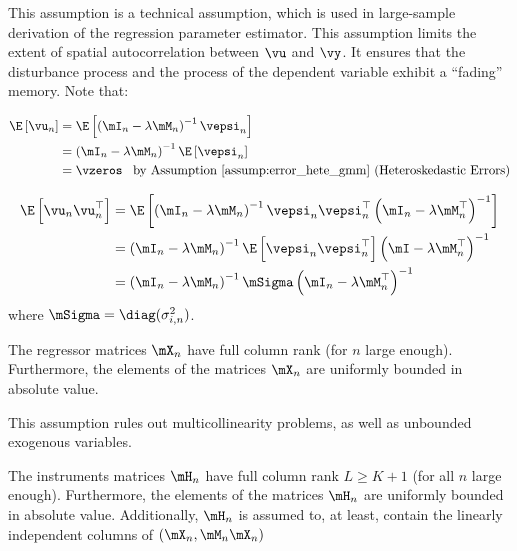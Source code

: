\documentclass[english,12pt]{book}\usepackage[]{graphicx}\usepackage[]{xcolor}
\begin{document}
This assumption is a technical assumption, which is used in large-sample derivation of the regression parameter estimator. This assumption limits the extent of spatial autocorrelation between $\vu$ and $\vy$. It ensures that the disturbance process and the process of the dependent variable exhibit a ``fading'' memory. Note that:

\begin{equation}
\begin{aligned}
\E\left[\vu_n \right] & = \E\left[\left(\mI_n - \lambda \mM_n\right)^{-1}\vepsi_n\right]  \\
             & = \left(\mI_n - \lambda \mM_n\right)^{-1} \E\left[\vepsi_n\right] \\
             & = \vzeros \;\;\;\mbox{by Assumption \ref{assump:error_hete_gmm} (Heteroskedastic Errors)}
\end{aligned}
\end{equation}

\begin{equation}
\begin{aligned}
	\E\left[\vu_n\vu^\top_n\right] & = \E\left[\left(\mI_n - \lambda \mM_n\right)^{-1}\vepsi_n\vepsi^\top_n\left(\mI_n - \lambda \mM^\top_n\right)^{-1}\right] \\
	& = \left(\mI_n - \lambda \mM_n\right)^{-1}\E\left[\vepsi_n\vepsi^\top_n\right]\left(\mI - \lambda \mM^\top_n\right)^{-1} \\
	& = \left(\mI_n - \lambda \mM_n\right)^{-1}\mSigma\left(\mI_n - \lambda \mM^\top_n\right)^{-1}
\end{aligned}
\end{equation}
%
where $\mSigma = \diag(\sigma^2_{i,n})$.

\begin{assumption}\label{assump:no_multi_gmmhet}
The regressor matrices $\mX_n$ have full column rank (for $n$ large enough). Furthermore, the elements of the matrices $\mX_n$ are uniformly bounded in absolute value.
\end{assumption}

This assumption rules out multicollinearity problems, as well as unbounded exogenous variables. 

\begin{assumption} The instruments matrices $\mH_n$ have full column rank $L \geq K + 1$ (for all $n$ large enough). Furthermore, the elements of the matrices $\mH_n$ are uniformly bounded in absolute value. Additionally, $\mH_n$ is assumed to, at least, contain the linearly independent columns of $(\mX_n, \mM_n\mX_n)$
\end{assumption}
\end{document}
